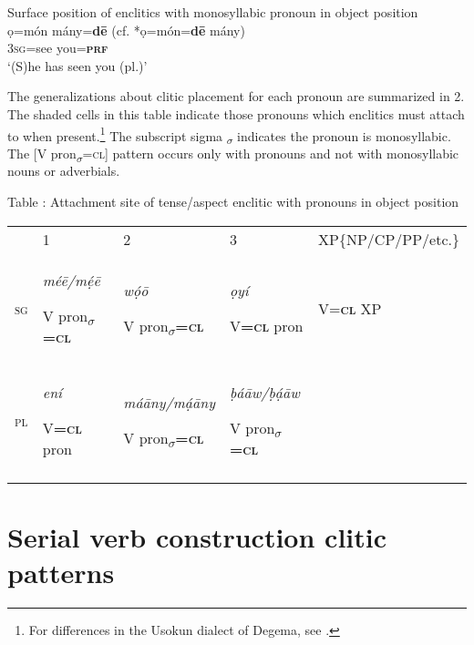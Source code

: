 \documentclass[output=paper]{langsci/langscibook}
\begin{document}
\ea
{Surface position of enclitics with monosyllabic pronoun in object position}\\
\gll  ọ=món   mány=\textbf{d\={e}  }(cf. *ọ=món=\textbf{d\={e}} mány)\\
     3\textsc{sg}=see   you=\textbf{\textsc{prf}}\\
\glt ‘(S)he has seen you (pl.)’ \citep[341]{Kari2004} 
\z

The generalizations about clitic placement for each pronoun are summarized in 2. The shaded cells in this table indicate those pronouns which enclitics must attach to when present.\footnote{For differences in the Usokun dialect of Degema, see \citet{Offah2000}. }
The subscript sigma \textsubscript{$\sigma $} indicates the pronoun is monosyllabic. The [V pron\textsubscript{$\sigma $}=\textsc{cl}] pattern occurs only with pronouns and not with monosyllabic nouns or adverbials.

\begin{table}
\label{bkm:Ref448075175}Table : Attachment site of tense/aspect enclitic with pronouns in object position

\begin{tabularx}{\textwidth}{XXXXX} & {1} & {2} & {3} & {XP\{NP/CP/PP/etc.\}}\\
\lsptoprule
{\scshape sg} & {\itshape mé\={e}/mẹ́\={e}}


{V pron\textsubscript{$\sigma $}\textbf{\textsc{=cl}}} & {\itshape wọ́\={o}}

{V pron\textsubscript{$\sigma $}\textbf{=}\textbf{\textsc{cl}}} & {\itshape ọyí}

{V\textbf{=}\textbf{\textsc{cl}} pron} & {V=\textbf{\textsc{cl}} XP}\\
{\scshape pl} & {\itshape ení}

{V\textbf{=}\textbf{\textsc{cl}} pron} & {\itshape má\={a}ny/mạ́\={a}ny}

{V pron\textsubscript{$\sigma $}\textbf{=}\textbf{\textsc{cl}}} & {\itshape ḅá\={a}w/ḅạ́\={a}w}

{V pron\textsubscript{$\sigma $}\textbf{=}\textbf{\textsc{cl}}} & \\
\hhline{----~}
\lspbottomrule
\end{tabularx}
\end{table}

\section{Serial verb construction clitic patterns}
\end{document}

